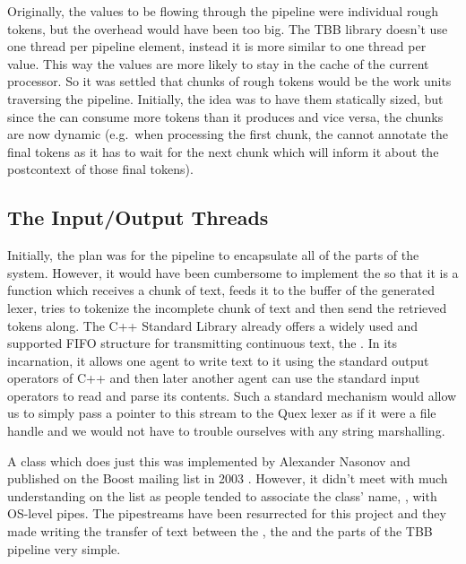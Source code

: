 Originally, the values to be flowing through the pipeline were individual rough
tokens, but the overhead would have been too big. The TBB library doesn't use
one thread per pipeline element, instead it is more similar to one thread per
value. This way the values are more likely to stay in the cache of the current
processor. So it was settled that chunks of rough tokens would be the work
units traversing the pipeline. Initially, the idea was to have them statically
sized, but since the  can consume more tokens than it
produces and vice versa, the chunks are now dynamic (e.g.\ when processing the
first chunk, the  cannot annotate the final tokens as it has
to wait for the next chunk which will inform it about the postcontext of those
final tokens).

\subsection{The Input/Output Threads}
\label{ssec:impl-parallel-io}

Initially, the plan was for the pipeline to encapsulate all of the parts of the
system. However, it would have been cumbersome to implement the
 so that it is a function which receives a chunk of text,
feeds it to the buffer of the generated lexer, tries to tokenize the incomplete
chunk of text and then send the retrieved tokens along. The C++ Standard
Library already offers a widely used and supported FIFO structure for
transmitting continuous text, the . In its
 incarnation, it allows one agent to write text to it using
the standard output operators of C++ and then later another agent can use the
standard input operators to read and parse its contents. Such a standard
mechanism would allow us to simply pass a pointer to this stream to the Quex
lexer as if it were a file handle and we would not have to trouble ourselves
with any string marshalling.

A class which does just this was implemented by Alexander Nasonov and published
on the Boost mailing list in 2003 \cite{web-pipes}. However, it didn't meet
with much understanding on the list as people tended to associate the class'
name, , with OS-level pipes. The pipestreams have been resurrected
for this project and they made writing the transfer of text between the
, the  and the parts of the TBB pipeline
very simple.

